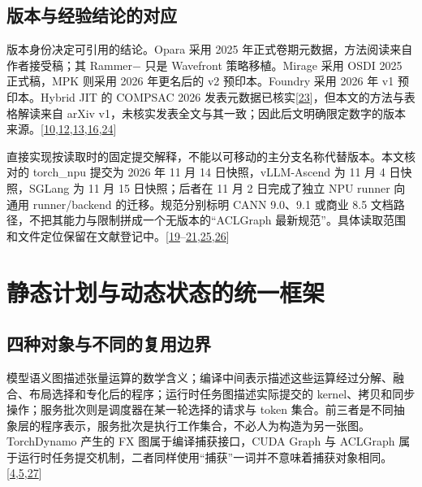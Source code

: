 \documentclass[
  UTF8,
  zihao=5]{ctexart}
\begin{document}
\hypertarget{ux7248ux672cux4e0eux7ecfux9a8cux7ed3ux8bbaux7684ux5bf9ux5e94}{%
\subsection{版本与经验结论的对应}\label{ux7248ux672cux4e0eux7ecfux9a8cux7ed3ux8bbaux7684ux5bf9ux5e94}}

版本身份决定可引用的结论。Opara 采用 2025
年正式卷期元数据，方法阅读来自作者接受稿；其 Rammer− 只是 Wavefront
策略移植。Mirage 采用 OSDI 2025 正式稿，MPK 则采用 2026 年更名后的 v2
预印本。Foundry 采用 2026 年 v1 预印本。Hybrid JIT 的 COMPSAC 2026
发表元数据已核实{[}\protect\hyperlink{ref-yadav2026hybrid}{23}{]}，但本文的方法与表格解读来自
arXiv
v1，未核实发表全文与其一致；因此后文明确限定数字的版本来源。{[}\protect\hyperlink{ref-chen2025opara}{10},\protect\hyperlink{ref-wu2025mirage}{12},\protect\hyperlink{ref-cheng2026mpk}{13},\protect\hyperlink{ref-liu2026foundry}{16},\protect\hyperlink{ref-yadav2026hybridpreprint}{24}{]}

直接实现按读取时的固定提交解释，不能以可移动的主分支名称代替版本。本文核对的
torch\_npu 提交为 2026 年 11 月 14 日快照，vLLM-Ascend 为 11 月 4
日快照，SGLang 为 11 月 15 日快照；后者在 11 月 2 日完成了独立 NPU
runner 向通用 runner/backend 的迁移。规范分别标明 CANN 9.0、9.1 或商业
8.5 文档路径，不把其能力与限制拼成一个无版本的``ACLGraph
最新规范''。具体读取范围和文件定位保留在文献登记中。{[}\protect\hyperlink{ref-torchnpu2026graphs}{19}--\protect\hyperlink{ref-sglang2026impl}{21},\protect\hyperlink{ref-sglang2026refactor}{25},\protect\hyperlink{ref-cann850updateapi}{26}{]}

\hypertarget{ux9759ux6001ux8ba1ux5212ux4e0eux52a8ux6001ux72b6ux6001ux7684ux7edfux4e00ux6846ux67b6}{%
\section{静态计划与动态状态的统一框架}\label{ux9759ux6001ux8ba1ux5212ux4e0eux52a8ux6001ux72b6ux6001ux7684ux7edfux4e00ux6846ux67b6}}

\hypertarget{ux56dbux79cdux5bf9ux8c61ux4e0eux4e0dux540cux7684ux590dux7528ux8fb9ux754c}{%
\subsection{四种对象与不同的复用边界}\label{ux56dbux79cdux5bf9ux8c61ux4e0eux4e0dux540cux7684ux590dux7528ux8fb9ux754c}}

模型语义图描述张量运算的数学含义；编译中间表示描述这些运算经过分解、融合、布局选择和专化后的程序；运行时任务图描述实际提交的
kernel、拷贝和同步操作；服务批次则是调度器在某一轮选择的请求与 token
集合。前三者是不同抽象层的程序表示，服务批次是执行工作集合，不必人为构造为另一张图。TorchDynamo
产生的 FX 图属于编译捕获接口，CUDA Graph 与 ACLGraph
属于运行时任务提交机制，二者同样使用``捕获''一词并不意味着捕获对象相同。{[}\protect\hyperlink{ref-nvidia2025cudaguide}{4},\protect\hyperlink{ref-cann900overview}{5},\protect\hyperlink{ref-ansel2024pytorch2}{27}{]}
\end{document}
